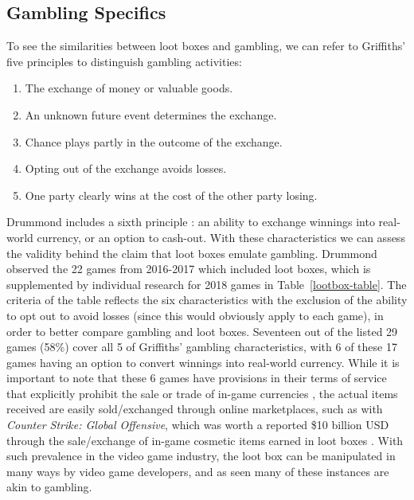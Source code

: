 \documentclass[11pt]{article}
\newcommand\genref[2]{#1~\ref{#2}}
\newcommand\tblref[1]{\genref{Table}{#1}}
\begin{document}
\subsection{Gambling Specifics} \label{griffith-gamble-sect}
To see the similarities between loot boxes and gambling, we can refer to Griffiths' 
five principles \cite{Drummond2018} to distinguish gambling activities: 
\begin{enumerate}
   \item The exchange of money or valuable goods.
   \item An unknown future event determines the exchange.
   \item Chance plays partly in the outcome of the exchange.
   \item Opting out of the exchange avoids losses.
   \item One party clearly wins at the cost of the other party losing.
\end{enumerate}
Drummond includes a sixth principle \cite{Drummond2018}: an ability to 
exchange winnings into real-world currency, or an option to cash-out. With these 
characteristics we can assess the validity behind the claim that loot boxes
emulate gambling. Drummond observed the 22 games from 2016-2017 
which included loot boxes, which is supplemented by individual research 
for 2018 games in \tblref{lootbox-table}. The criteria of the table reflects the six characteristics
with the exclusion of the ability to opt out to avoid losses (since this would
obviously apply to each game), in order to better compare gambling and 
loot boxes. Seventeen out of the listed 29 games (58\%) cover all 5 of Griffiths' 
gambling characteristics, with 6 of these 17 games having an option to 
convert winnings into real-world currency. While it is important to note
that these 6 games have provisions in their terms of service that
explicitly prohibit the sale or trade of in-game currencies
 \cite{Drummond2018} , the actual items received are easily
  sold/exchanged through online marketplaces, such as with 
  \textit{Counter Strike: Global Offensive}, which was worth a reported
\$10 billion USD through the sale/exchange of in-game cosmetic items 
earned in loot boxes \cite{juniper2018}. With such prevalence in the 
video game industry, the loot box can be manipulated in many ways 
by video game developers, and as seen many of these instances
are akin to gambling.
\end{document}
